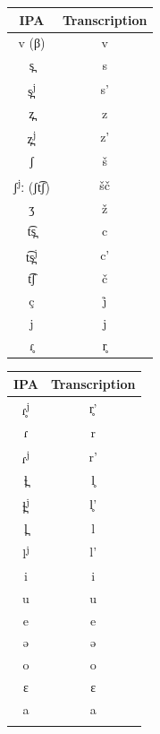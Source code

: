 \documentclass[a4paper, 12pt]{article}
\begin{document}
\begin{minipage}[t]{.3\linewidth}
\begin{table}[H]
\begin{tabular}{cc}
\toprule
IPA        & Transcription \\
\bottomrule
v (β)      & v                       \\
s̪         & s                       \\
s̪\textsuperscript{j}        & s'                      \\
z̪         & z                       \\
z̪\textsuperscript{j}         & z'                      \\
ʃ          & š                       \\
ʃ\textsuperscript{j}ː (ʃt͡ʃ) & šč                      \\
ʒ          & ž                       \\
t͡s̪       & c                       \\
t͡s̪\textsuperscript{j}      & c'                      \\
t͡ʃ        & č                       \\
ç         & j̊                      \\
j          & j                       \\
ɾ̥         & r̥                      \\
\bottomrule
\end{tabular}
\end{table}
\end{minipage}	
\hfill
\begin{minipage}[t]{.3\linewidth}
\begin{table}[H]
\begin{tabular}{cc}
\toprule
IPA        & Transcription \\
\bottomrule
ɾ̥\textsuperscript{j}        & r̥'                     \\
ɾ          & r                       \\
ɾ\textsuperscript{j}         & r'                      \\
ɬ̪         & l̥                      \\
ɬ̪\textsuperscript{j}        & l̥'                     \\
l̪         & l                       \\
l\textsuperscript{j}        & l'                      \\
i          & i                       \\
u          & u                       \\
e          & e                       \\
ə          & ə                       \\
o          & o                       \\
ɛ          & ɛ                       \\
a          & a                      \\
\addlinespace[0.065cm]
\bottomrule
\end{tabular}
\end{table}
\end{minipage}	
\end{document}
